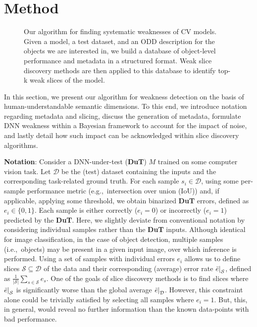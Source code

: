 \section{Method}
\label{sec:method}


\begin{figure*}[!bht] %
  \centering
  
    
  \caption{Our algorithm for finding systematic weaknesses of CV models. Given a model, a test dataset, and an ODD description for the objects we are interested in, we build a database of object-level performance and metadata in a structured format. Weak slice discovery methods are then applied to this database to identify top-k weak slices of the model.}
  \label{fig:workflow}
\end{figure*}

In this section, we present our algorithm for weakness detection on the basis of human-understandable semantic dimensions. To this end, we introduce notation regarding metadata and slicing, discuss the generation of metadata, formulate DNN weakness within a Bayesian framework to account for the impact of noise, and lastly detail how such impact can be acknowledged within slice discovery algorithms.





\textbf{Notation}: Consider a DNN-under-test (\textbf{DuT}) $M$ trained on some computer vision task. Let $\mathcal D$ be the (test) dataset containing the inputs and the corresponding task-related ground truth.
For each sample $s_i\in\mathcal D$, using some per-sample performance metric (e.g.,\ intersection over union (IoU)) and, if applicable, applying some threshold, we obtain binarized \textbf{DuT} errors, defined as $e_i \in \{0, 1\}$. Each sample is either correctly ($e_i=0$) or incorrectly ($e_i=1$) predicted by the \textbf{DuT}.
Here, we slightly deviate from conventional notation by considering individual samples rather than the \textbf{DuT} inputs.
Although identical for image classification, in the case of object detection, multiple samples (i.e.,\ objects) may be present in a given input image, over which inference is performed.
Using a set of samples with individual errors $e_i$ allows us to define slices $\mathcal S\subseteq\mathcal D$ of the data and their corresponding (average) error rate $\restr{\bar{e}}{\mathcal S}$, defined as $\frac{1}{|\mathcal{S}|}\sum_{s\in\mathcal{S}}{e_s}$.
One of the goals of slice discovery methods is to find slices where $\restr{\bar{e}}{\mathcal S}$ is significantly worse than the global average $\restr{\bar{e}}{\mathcal D}$.
However, this constraint alone could be trivially satisfied by selecting all samples where $e_i=1$.
But, this, in general, would reveal no further information than the known data-points with bad performance.

